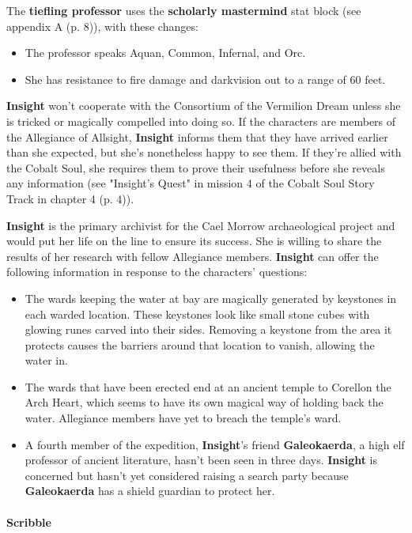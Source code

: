 \documentclass[letterpaper, 11pt, bg=full, twocolumn]{dndbook}
\begin{document}
The \textbf{tiefling professor} uses the \textbf{scholarly mastermind} stat block (see appendix A (p. 8)), with these changes:

\begin{itemize}
\item The professor speaks Aquan, Common, Infernal, and Orc.
\item She has resistance to fire damage and darkvision out to a range of 60 feet.
\end{itemize}

\textbf{Insight} won't cooperate with the Consortium of the Vermilion Dream unless she is tricked or magically compelled into doing so. If the characters are members of the Allegiance of Allsight, \textbf{Insight} informs them that they have arrived earlier than she expected, but she's nonetheless happy to see them. If they're allied with the Cobalt Soul, she requires them to prove their usefulness before she reveals any information (see "Insight's Quest" in mission 4 of the Cobalt Soul Story Track in chapter 4 (p. 4)).

\textbf{Insight} is the primary archivist for the Cael Morrow archaeological project and would put her life on the line to ensure its success. She is willing to share the results of her research with fellow Allegiance members. \textbf{Insight} can offer the following information in response to the characters' questions:

\begin{itemize}
\item The wards keeping the water at bay are magically generated by keystones in each warded location. These keystones look like small stone cubes with glowing runes carved into their sides. Removing a keystone from the area it protects causes the barriers around that location to vanish, allowing the water in.
\item The wards that have been erected end at an ancient temple to Corellon the Arch Heart, which seems to have its own magical way of holding back the water. Allegiance members have yet to breach the temple's ward.
\item A fourth member of the expedition, \textbf{Insight}'s friend \textbf{Galeokaerda}, a high elf professor of ancient literature, hasn't been seen in three days. \textbf{Insight} is concerned but hasn't yet considered raising a search party because \textbf{Galeokaerda} has a shield guardian to protect her.
\end{itemize}

\paragraph{Scribble}
\end{document}
